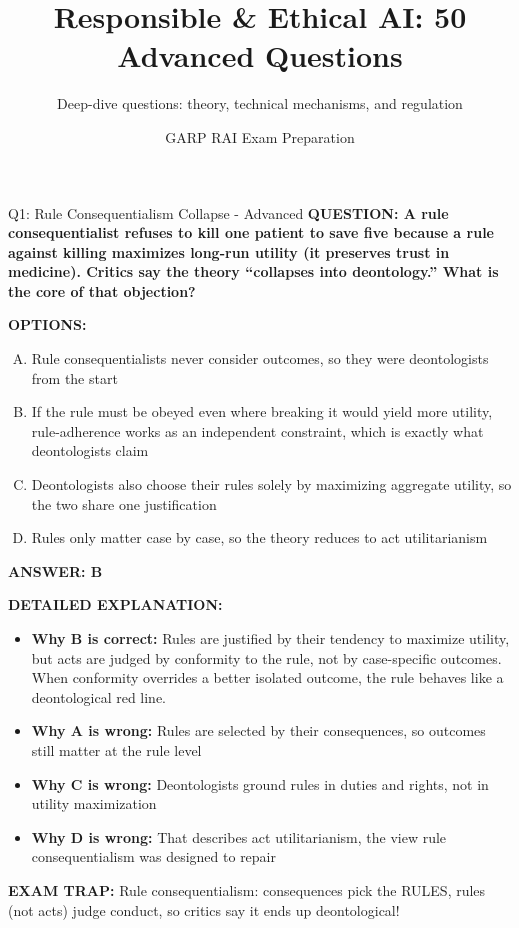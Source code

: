 \documentclass[8pt]{beamer}
\title{Responsible \& Ethical AI: 50 Advanced Questions}
\subtitle{Deep-dive questions: theory, technical mechanisms, and regulation}
\author{GARP RAI Exam Preparation}
\date{}
\begin{document}
\begin{frame}
	\titlepage
\end{frame}


\begin{frame}[shrink=6]{Q1: Rule Consequentialism Collapse - Advanced}
\fontsize{6.5}{7.5}\selectfont
\textbf{QUESTION: A rule consequentialist refuses to kill one patient to save five because a rule against killing maximizes long-run utility (it preserves trust in medicine). Critics say the theory ``collapses into deontology.'' What is the core of that objection?}

\vspace{0.1cm}
\textbf{OPTIONS:}
\begin{enumerate}[A.]
\item Rule consequentialists never consider outcomes, so they were deontologists from the start
\item If the rule must be obeyed even where breaking it would yield more utility, rule-adherence works as an independent constraint, which is exactly what deontologists claim
\item Deontologists also choose their rules solely by maximizing aggregate utility, so the two share one justification
\item Rules only matter case by case, so the theory reduces to act utilitarianism
\end{enumerate}

\vspace{0.1cm}
\textcolor{myblue}{\textbf{ANSWER: B}}

\vspace{0.1cm}
\textbf{DETAILED EXPLANATION:}
\begin{itemize}
\item \textbf{Why B is correct:} Rules are justified by their tendency to maximize utility, but acts are judged by conformity to the rule, not by case-specific outcomes. When conformity overrides a better isolated outcome, the rule behaves like a deontological red line.
\item \textbf{Why A is wrong:} Rules are selected by their consequences, so outcomes still matter at the rule level
\item \textbf{Why C is wrong:} Deontologists ground rules in duties and rights, not in utility maximization
\item \textbf{Why D is wrong:} That describes act utilitarianism, the view rule consequentialism was designed to repair
\end{itemize}

\textcolor{myred}{\textbf{EXAM TRAP:}} Rule consequentialism: consequences pick the RULES, rules (not acts) judge conduct, so critics say it ends up deontological!
\end{frame}
\end{document}
